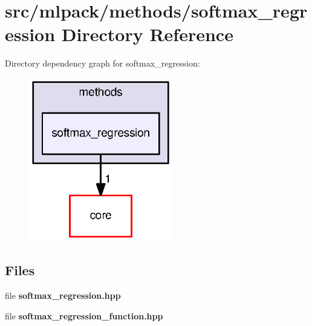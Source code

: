 \section{src/mlpack/methods/softmax\+\_\+regression Directory Reference}
\label{dir_ef6c2ad6ea2e7fbc564fdee0127eb9cb}
Directory dependency graph for softmax\+\_\+regression\+:
\nopagebreak
\begin{figure}[H]
\begin{center}
\leavevmode
\includegraphics[width=178pt]{dir_ef6c2ad6ea2e7fbc564fdee0127eb9cb_dep}
\end{center}
\end{figure}
\subsection*{Files}
\begin{DoxyCompactItemize}
\item 
file {\bf softmax\+\_\+regression.\+hpp}
\item 
file {\bf softmax\+\_\+regression\+\_\+function.\+hpp}
\end{DoxyCompactItemize}
